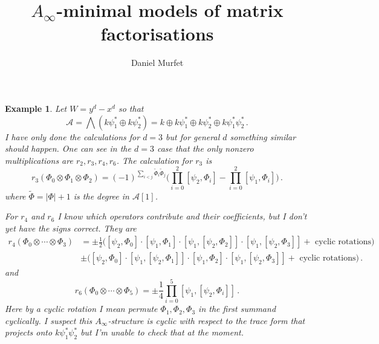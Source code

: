 \documentclass[english,letter paper,12pt,leqno]{article}
\theoremstyle{example}
\newtheorem{example}[theorem]{Example}
\numberwithin{equation}{section}
\def\res{\operatorname{Res}}
\begin{document}
\def\Res{\res\!}
\newcommand{\ud}{\mathrm{d}}
\newcommand{\Ress}[1]{\res_{#1}\!}
\newcommand{\cat}[1]{\mathcal{#1}}
\newcommand{\lto}{\longrightarrow}
\newcommand{\xlto}[1]{\stackrel{#1}\lto}
\newcommand{\mf}[1]{\mathfrak{#1}}
\newcommand{\md}[1]{\mathscr{#1}}
\def\sus{\l}
\def\l{\,|\,}
\def\sgn{\textup{sgn}}

\title{$A_\infty$-minimal models of matrix factorisations}
\author{Daniel Murfet}

\maketitle

\begin{example} Let $W = y^d - x^d$ so that
\[
\md{A} = \bigwedge( k \psi_1^* \oplus k \psi_2^* ) = k \oplus k \psi_1^* \oplus k \psi_2^* \oplus k \psi_1^* \psi_2^*\,.
\]
I have only done the calculations for $d = 3$ but for general $d$ something similar should happen. One can see in the $d = 3$ case that the only nonzero multiplications are $r_2, r_3, r_4, r_6$. The calculation for $r_3$ is
\[
r_3( \Phi_0 \otimes \Phi_1 \otimes \Phi_2 ) = (-1)^{\sum_{i<j} \widetilde{\Phi}_i \widetilde{\Phi}_j}\Big( \prod_{i=0}^2 [\psi_2, \Phi_i] - \prod_{i=0}^2 [ \psi_1, \Phi_i ] \Big)\,.
\]
where $\widetilde{\Phi} = |\Phi| + 1$ is the degree in $\md{A}[1]$.

For $r_4$ and $r_6$ I know which operators contribute and their coefficients, but I don't yet have the signs correct. They are
\begin{align*}
r_4( \Phi_0 \otimes \cdots \otimes \Phi_3 ) &= \pm \frac{1}{2}\Big( [ \psi_2, \Phi_0] \cdot [ \psi_1, \Phi_1 ] \cdot [ \psi_1, [ \psi_2, \Phi_2 ] ] \cdot [ \psi_1, [ \psi_2, \Phi_3 ]] + \text{ cyclic rotations} \Big)\\
& \pm \Big( [ \psi_2, \Phi_0 ] \cdot [ \psi_1, [ \psi_2, \Phi_1 ] ] \cdot [ \psi_1, \Phi_2 ] \cdot [ \psi_1, [ \psi_2, \Phi_3 ]] + \text{ cyclic rotations} \Big)\,.
\end{align*}
and
\[
r_6( \Phi_0 \otimes \cdots \otimes \Phi_5 ) = \pm \frac{1}{4} \prod_{i=0}^5 [ \psi_1, [\psi_2, \Phi_i ]]\,.
\]
Here by a cyclic rotation I mean permute $\Phi_1, \Phi_2, \Phi_3$ in the first summand cyclically. I suspect this $A_\infty$-structure is cyclic with respect to the trace form that projects onto $k \psi_1^* \psi_2^*$ but I'm unable to check that at the moment.
\end{example}

\providecommand{\bysame}{\leavevmode\hbox to3em{\hrulefill}\thinspace}
\end{document}
